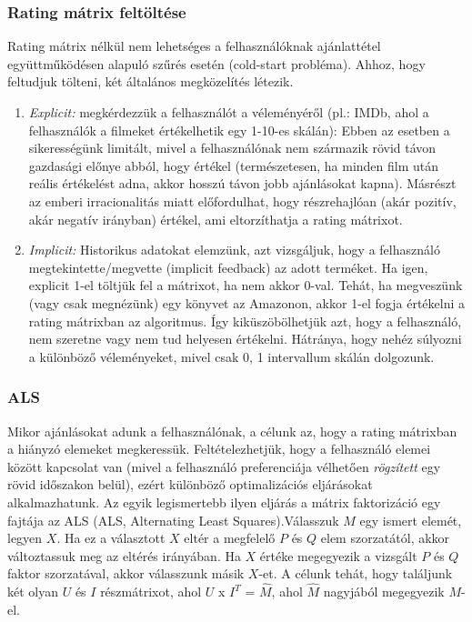 \documentclass[a4paper,12pt]{article}
\begin{document}
\subsubsection{Rating mátrix feltöltése}
Rating mátrix nélkül nem lehetséges a felhasználóknak ajánlattétel együttműködésen alapuló szűrés esetén (cold-start probléma). Ahhoz, hogy feltudjuk tölteni, két általános megközelítés létezik.
\begin{enumerate}
\item \textsl{Explicit:} megkérdezzük a felhasználót a véleményéről (pl.: IMDb, ahol a felhasználók a filmeket értékelhetik egy 1-10-es skálán)\cite{imdb}: Ebben az esetben a sikerességünk limitált, mivel a felhasználónak nem származik rövid távon gazdasági előnye abból, hogy értékel (természetesen, ha minden film után reális értékelést adna, akkor hosszú távon jobb ajánlásokat kapna). Másrészt az emberi irracionalitás miatt előfordulhat, hogy részrehajlóan (akár pozitív, akár negatív irányban) értékel, ami eltorzíthatja a rating mátrixot. \cite{introspection}
\item \textsl{Implicit:} Historikus adatokat elemzünk, azt vizsgáljuk, hogy a felhasználó megtekintette/megvette (implicit feedback) az adott terméket. Ha igen, explicit 1-el töltjük fel a mátrixot, ha nem akkor 0-val. Tehát, ha megveszünk (vagy csak megnézünk) egy könyvet az Amazonon, akkor 1-el fogja értékelni a rating mátrixban az algoritmus. Így kiküszöbölhetjük azt, hogy a felhasználó, nem szeretne vagy nem tud helyesen értékelni. Hátránya, hogy nehéz súlyozni a különböző véleményeket, mivel csak {0, 1} intervallum skálán dolgozunk.
\end{enumerate}


\subsubsection{ALS}
Mikor ajánlásokat adunk a felhasználónak, a célunk az, hogy a rating mátrixban a hiányzó elemeket megkeressük. Feltételezhetjük, hogy a felhasználó elemei között kapcsolat van (mivel a felhasználó preferenciája vélhetően \textsl{rögzített} egy rövid időszakon belül), ezért különböző optimalizációs eljárásokat alkalmazhatunk. Az egyik legismertebb ilyen eljárás a mátrix faktorizáció egy fajtája az ALS (ALS, Alternating Least Squares).Válasszuk $M$ egy ismert elemét, legyen $X$. Ha ez a választott $X$ eltér a megfelelő $P$ és $Q$ elem szorzatától, akkor változtassuk meg az eltérés irányában. Ha $X$ értéke megegyezik a vizsgált $P$ és $Q$ faktor szorzatával, akkor válasszunk másik $X$-et. A célunk tehát, hogy találjunk két olyan $U$ és $I$ részmátrixot, ahol $U$ x $I^T$ = $\hat{M}$, ahol $\hat{M}$ nagyjából megegyezik $M$-el.
\end{document}
